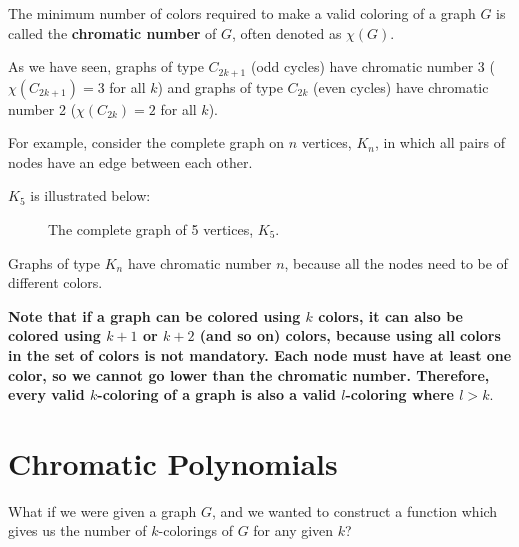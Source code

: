 \documentclass[12pt]{exam}
\begin{document}
The minimum number of colors required to make a valid coloring of a graph $G$ is called the \textbf{chromatic number} of $G$, often denoted as $\chi(G)$.

As we have seen, graphs of type $C_{2k+1}$ (odd cycles) have chromatic number 3 ($\chi(C_{2k+1}) = 3$ for all $k$) and graphs of type $C_{2k}$ (even cycles) have chromatic number 2 ($\chi({C_{2k}}) = 2$ for all $k$).

For example, consider the complete graph on $n$ vertices, $K_n$, in which all pairs of nodes have an edge between each other.

$K_5$ is illustrated below:

\newpage

\begin{figure}[h]

    \centering
    

    \caption{The complete graph of 5 vertices, $K_5$.}
    
\end{figure}

Graphs of type $K_n$ have chromatic number $n$, because all the nodes need to be of different colors.

\textbf{Note that if a graph can be colored using $k$ colors, it can also be colored using $k+1$ or $k+2$ (and so on) colors, because using all colors in the set of colors is not mandatory. Each node must have at least one color, so we cannot go lower than the chromatic number. Therefore, every valid $k$-coloring of a graph is also a valid $l$-coloring where $l>k$}. 

\section{Chromatic Polynomials}

What if we were given a graph $G$, and we wanted to construct a function which gives us the number of $k$-colorings of $G$ for any given $k$?
\end{document}

